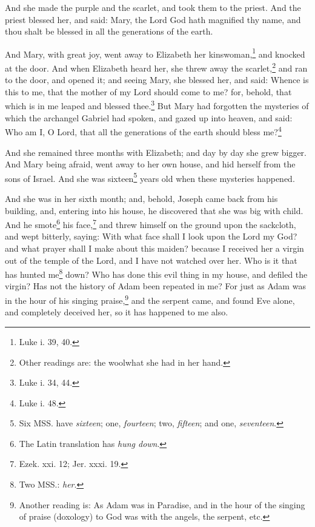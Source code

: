 \pend\pstart
{}

\pend\setcounter{pstartR}{1}\pstart
And she made the purple and the scarlet, and took them to the priest. And the priest blessed her, and said: Mary, the Lord God hath magnified thy name, and thou shalt be blessed in all the generations of the earth.

\pend\pstart
And Mary, with great
joy, went away to Elizabeth her kinswoman,\footnote{Luke i. 39, 40.} and knocked at the door. And when Elizabeth heard her, she threw away the scarlet,\footnote{Other readings are: the wool\textemdash what she had in her hand.} and ran to the door, and opened it; and seeing Mary, she blessed her, and said: Whence is this to me, that the mother of my Lord should come to me? for, behold, that which is in me leaped and blessed thee.\footnote{Luke i. 34, 44.} But Mary had forgotten the mysteries of which the archangel Gabriel had spoken, and gazed up into heaven, and said: Who am I, O Lord, that all the generations of the earth should bless me?\footnote{Luke i. 48.}

\pend\pstart
And she remained three months with Elizabeth; and day by day she grew bigger. And Mary being afraid, went away to her own house, and hid herself from the sons of Israel. And she was sixteen\footnote{Six MSS. have \textit{sixteen}; one, \textit{fourteen}; two, \textit{fifteen}; and one, \textit{seventeen}.} years old when these mysteries happened.

\pend\pstart
{}

\pend\setcounter{pstartR}{1}\pstart
And she was in her sixth month; and, behold, Joseph came back from his building, and, entering into his house, he discovered that she was big with child. And he smote\footnote{The Latin translation has \textit{hung down}.} his face,\footnote{Ezek. xxi. 12; Jer. xxxi. 19.} and threw himself on the ground upon the sackcloth, and wept bitterly, saying: With what face shall I look upon the Lord my God? and what prayer shall I make about this maiden? because I received her a virgin out of the temple of the Lord, and I have not watched over her. Who is it that has hunted me\footnote{Two MSS.: \textit{her}.} down? Who has done this evil thing in my house, and defiled the virgin? Has not the history of Adam been repeated in me? For just as Adam was in the hour of his singing praise,\footnote{Another reading is: As Adam was in Paradise, and in the hour of the singing of praise (doxology) to God was with the angels, the serpent, etc.} and the serpent came, and found Eve alone, and completely deceived her, so it has happened to me also.

